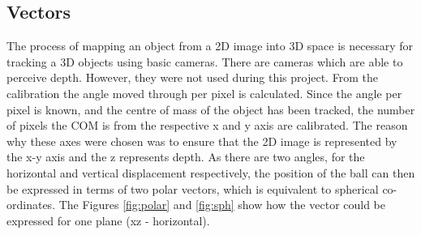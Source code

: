 \documentclass{article}
\begin{document}
\subsection{Vectors}

The process of mapping an object from a 2D image into 3D space is necessary for tracking a 3D objects using basic cameras. There are cameras which are able to perceive depth. However, they were not used during this project. From the calibration the angle moved through per pixel is calculated. Since the angle per pixel is known, and the centre of mass of the object has been tracked, the number of pixels the COM is from the respective x and y axis are calibrated. The reason why these axes were chosen was to ensure that the 2D image is represented by the x-y axis and the z represents depth. As there are two angles, for the horizontal and vertical displacement respectively, the position of the ball can then be expressed in terms of two polar vectors, which is equivalent to spherical co-ordinates. The Figures \ref{fig:polar} and \ref{fig:sph} show how the vector could be expressed for one plane (xz - horizontal).
\end{document}
